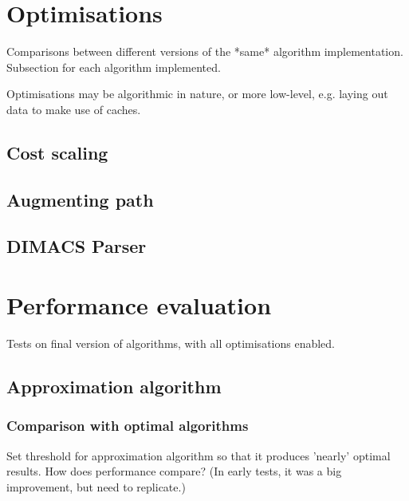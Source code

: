 \section{Optimisations}

Comparisons between different versions of the *same* algorithm implementation. Subsection for each algorithm implemented.

Optimisations may be algorithmic in nature, or more low-level, e.g. laying out data to make use of caches.

\subsection{Cost scaling}


\subsection{Augmenting path}

\subsection{DIMACS Parser}

\section{Performance evaluation}

Tests on final version of algorithms, with all optimisations enabled.

\subsection{Approximation algorithm} \label{sec:eval-approx}


\subsubsection{Comparison with optimal algorithms}

Set threshold for approximation algorithm so that it produces 'nearly' optimal results. How does performance compare? (In early tests, it was a big improvement, but need to replicate.)

